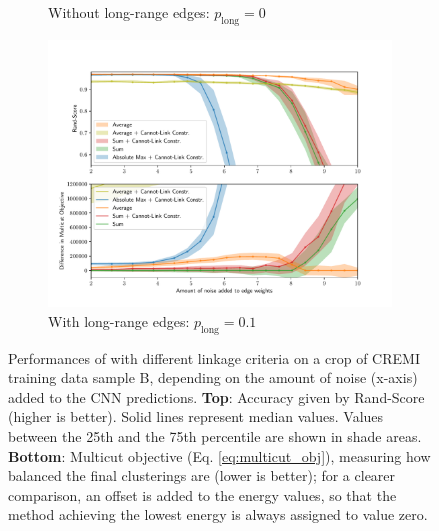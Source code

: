 \begin{figure}
\begin{subfigure}[t]{0.49 \textwidth}
        \caption{Without long-range edges: $p_{\mathrm{long}}=0$} \label{fig:merge_noise_only_direct}
    \end{subfigure} \hfill
    \begin{subfigure}[t]{0.49 \textwidth}
        \centering
        \includegraphics[width=\textwidth,trim=0.53in 0.35in 0.65in 0.80in,clip]{./figs/merge_noise_long_range.pdf}
        \caption{With long-range edges: $p_{\mathrm{long}}=0.1$} \label{fig:merge_noise_with_long_range}
    \end{subfigure}
\caption{Performances of \algname{} with different linkage criteria on a crop of CREMI training data sample B, depending on the amount of noise (x-axis) added to the CNN predictions. \textbf{Top}: Accuracy given by Rand-Score (higher is better). Solid lines represent median values. Values between the 25th and the 75th percentile are shown in shade areas. \textbf{Bottom}: Multicut objective (Eq. \ref{eq:multicut_obj}), measuring how balanced the final clusterings are (lower is better); for a clearer comparison, an offset is added to the energy values, so that the method achieving the lowest energy is always assigned to value zero.
}\label{fig:noise_plots}
\end{figure}


